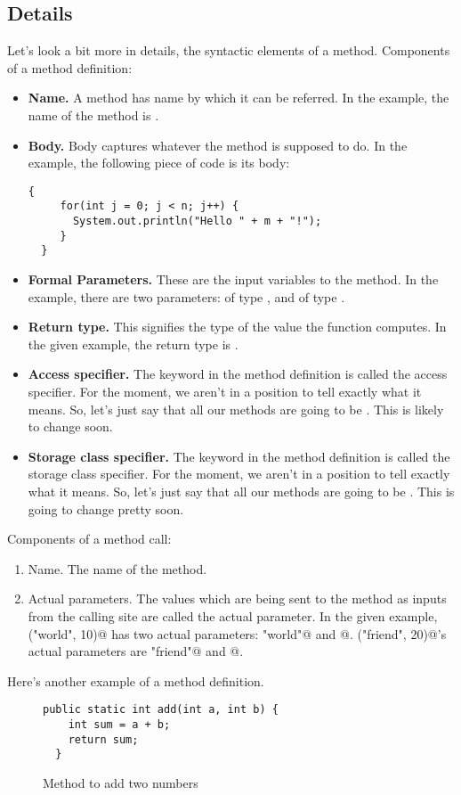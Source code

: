 \documentclass[12pt,a4paper]{article}
\begin{document}
\subsection{Details}
Let's look a bit more in details, the syntactic elements of a method. Components of a method definition:
\begin{itemize}
	\item \textbf{Name.} A method has name by which it can be referred. In the example, the name of the method is \lstinline@printMessage@.
	\item \textbf{Body.} Body captures whatever the method is supposed to do. In the example, the following piece of code is its body:
\begin{lstlisting}[frame=single]
  {
     for(int j = 0; j < n; j++) {
       System.out.println("Hello " + m + "!");
     }
  }
\end{lstlisting}
	\item \textbf{Formal Parameters.} These are the input variables to the method. In the example, there are two parameters: \lstinline@m@ of type \lstinline@String@, and \lstinline@n@ of type \lstinline@int@.
	\item \textbf{Return type.} This signifies the type of the value the function computes. In the given example, the return type is \lstinline@void@.
	\item \textbf{Access specifier.} The keyword \lstinline@public@ in the method definition is called the access specifier. For the moment, we aren't in a position to tell exactly what it means. So, let's just say that all our methods are going to be \lstinline@public@. This is likely to change soon.
	\item \textbf{Storage class specifier.} The keyword \lstinline@storage@ in the method definition is called the storage class specifier. For the moment, we aren't in a position to tell exactly what it means. So, let's just say that all our methods are going to be \lstinline@static@. This is going to change pretty soon.
\end{itemize}

Components of a method call:
\begin{enumerate}
	\item Name. The name of the method.
	\item Actual parameters. The values which are being sent to the method as inputs from the calling site are called the actual parameter. In the given example, \lstinline@printMessage("world", 10)@ has two actual parameters: \lstinline@"world"@ and @. \lstinline@printMessage("friend", 20)@'s actual parameters are \lstinline@"friend"@ and @.
\end{enumerate}
Here's another example of a method definition.
\begin{figure}[H]
\begin{lstlisting}[frame=single]
  public static int add(int a, int b) {
    int sum = a + b;
    return sum;
  }
\end{lstlisting}
\caption{Method \lstinline@add@ to add two numbers}
\label{f:meth2}
\end{figure}
\end{document}
